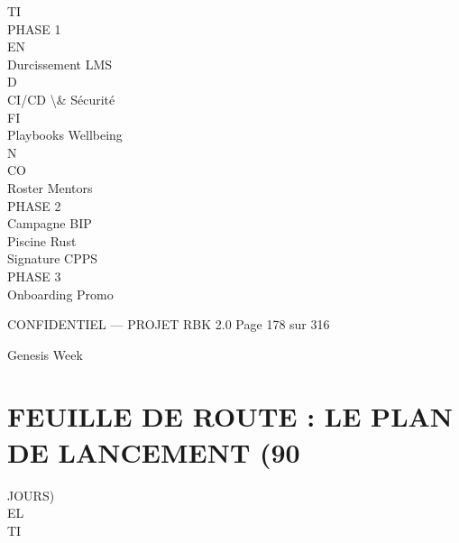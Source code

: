 \vspace{0.5em}
TI\\
PHASE 1\\
\vspace{0.5em}
\vspace{0.5em}
\vspace{0.5em}
\vspace{0.5em}
EN\\
Durcissement LMS\\
\vspace{0.5em}
\vspace{0.5em}
\vspace{0.5em}
\vspace{0.5em}
D\\
CI/CD \textbackslash{}& Sécurité\\
\vspace{0.5em}
\vspace{0.5em}
\vspace{0.5em}
\vspace{0.5em}
FI\\
Playbooks Wellbeing\\
N\\
CO\\
Roster Mentors\\
\vspace{0.5em}
PHASE 2\\
\vspace{0.5em}
Campagne BIP\\
\vspace{0.5em}
Piscine Rust\\
\vspace{0.5em}
Signature CPPS\\
\vspace{0.5em}
PHASE 3\\
\vspace{0.5em}
Onboarding Promo\\
\begin{confidential}CONFIDENTIEL — PROJET RBK 2.0                     Page 178 sur 316\end{confidential}
Genesis Week\\
\section{FEUILLE DE ROUTE : LE PLAN DE LANCEMENT (90}
JOURS)\\
\vspace{0.5em}
\vspace{0.5em}
\vspace{0.5em}
\vspace{0.5em}
EL\\
TI\\
